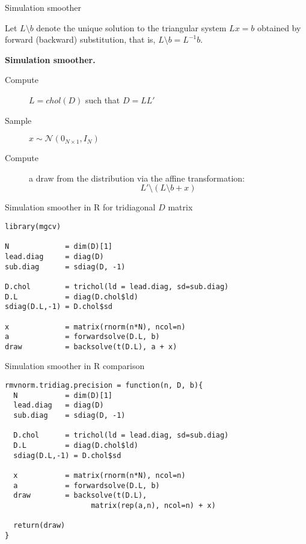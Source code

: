 \documentclass[notes,blackandwhite,mathsans,usenames,dvipsnames]{beamer}
\begin{document}
\begin{frame}{Simulation smoother}

{\color{mcxs2}Let} $L\setminus b$ {\color{mcxs2}denote the unique solution to the triangular system} $Lx=b$ {\color{mcxs2}obtained by forward (backward) substitution, that is,} $L\setminus b=L^{-1}b$. 

\bigskip\textbf{Simulation smoother.}
\begin{description}
\item[Compute]  $L=chol(D)$ {\color{mcxs2}such that} $D=LL'$
\item[Sample] $x\sim \mathcal{N}\left(0_{N\times 1},I_{N}\right)$
\item[Compute] {\color{mcxs2}a draw from the distribution via the affine transformation:} 
$$ L'\setminus (L\setminus b + x) $$
\end{description}

\end{frame}


\begin{frame}[fragile]{Simulation smoother in R for tridiagonal $D$ matrix}

\begin{verbatim}
library(mgcv)

N             = dim(D)[1]
lead.diag     = diag(D)
sub.diag      = sdiag(D, -1)
  
D.chol        = trichol(ld = lead.diag, sd=sub.diag)
D.L           = diag(D.chol$ld)
sdiag(D.L,-1) = D.chol$sd
  
x             = matrix(rnorm(n*N), ncol=n)
a             = forwardsolve(D.L, b)
draw          = backsolve(t(D.L), a + x)
\end{verbatim}

\end{frame}



\begin{frame}[fragile]{Simulation smoother in R {\color{purple}comparison}}

\begin{verbatim}
rmvnorm.tridiag.precision = function(n, D, b){
  N           = dim(D)[1]
  lead.diag   = diag(D)
  sub.diag    = sdiag(D, -1)
  
  D.chol      = trichol(ld = lead.diag, sd=sub.diag)
  D.L         = diag(D.chol$ld)
  sdiag(D.L,-1) = D.chol$sd
  
  x           = matrix(rnorm(n*N), ncol=n)
  a           = forwardsolve(D.L, b)
  draw        = backsolve(t(D.L), 
                    matrix(rep(a,n), ncol=n) + x)
  
  return(draw)
}
\end{verbatim}

\end{frame}
\end{document}

